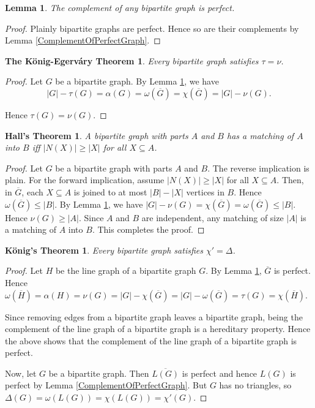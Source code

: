 \documentclass[12pt]{article}
\theoremstyle{plain}
\newtheorem{lem}[thm]{Lemma}
\newtheorem*{KonigEgervary}{The K{\"o}nig-Egerv{\'a}ry Theorem}
\newtheorem*{Konig}{K{\"o}nig's Theorem}
\newtheorem*{Hall}{Hall's Theorem}
\theoremstyle{definition}
\theoremstyle{remark}
\newcommand{\card}[1]{\left|#1\right|}
\begin{document}
\begin{lem}\label{BipartiteComplement}
The complement of any bipartite graph is perfect.
\end{lem}
\begin{proof}
Plainly bipartite graphs are perfect.  Hence so are their complements by Lemma \ref{ComplementOfPerfectGraph}.
\end{proof}

\begin{KonigEgervary}\label{KonigEgervary}
Every bipartite graph satisfies $\tau = \nu$.
\end{KonigEgervary}
\begin{proof}
Let $G$ be a bipartite graph.  By Lemma \ref{BipartiteComplement}, we have
\[\card{G} - \tau(G) = \alpha(G) = \omega(\overline{G}) = \chi(\overline{G}) = \card{G} - \nu(G).\]

Hence $\tau(G) = \nu(G)$.
\end{proof}

\begin{Hall}\label{Hall}
A bipartite graph with parts $A$ and $B$ has a matching of $A$ into $B$ iff
$\card{N(X)} \geq \card{X}$ for all $X \subseteq A$.
\end{Hall}
\begin{proof}
Let $G$ be a bipartite graph with parts $A$ and $B$.  The reverse implication is plain.  For the forward implication, assume $\card{N(X)} \geq \card{X}$ for all $X \subseteq A$.  Then, in $\overline{G}$, each $X \subseteq A$ is joined to at most $\card{B} - \card{X}$ vertices in $B$.  Hence $\omega(\overline{G}) \leq \card{B}$.  By Lemma \ref{BipartiteComplement}, we have $\card{G} - \nu(G) = \chi(\overline{G}) = \omega(\overline{G}) \leq \card{B}$.  Hence $\nu(G) \geq \card{A}$.  Since $A$ and $B$ are independent, any matching of size $\card{A}$ is a matching of $A$ into $B$.  This completes the proof.
\end{proof}

\begin{Konig}
Every bipartite graph satisfies $\chi' = \Delta$.
\end{Konig}
\begin{proof}
Let $H$ be the line graph of a bipartite graph $G$.  By Lemma \ref{BipartiteComplement}, $\overline{G}$ is perfect.  Hence $\omega(\overline{H}) = \alpha(H) = \nu(G) = \card{G} - \chi(\overline{G}) = \card{G} - \omega(\overline{G}) = \tau(G) = \chi(\overline{H})$.  

Since removing edges from a bipartite graph leaves a bipartite graph, being the complement of the line graph of a bipartite graph is a hereditary property.  Hence the above shows that the complement of the line graph of a bipartite graph is perfect.

Now, let $G$ be a bipartite graph. Then $\overline{L(G)}$ is perfect and hence $L(G)$ is perfect by Lemma \ref{ComplementOfPerfectGraph}. But
$G$ has no triangles, so $\Delta(G) = \omega(L(G)) = \chi(L(G)) = \chi'(G)$.
\end{proof}
\end{document}
